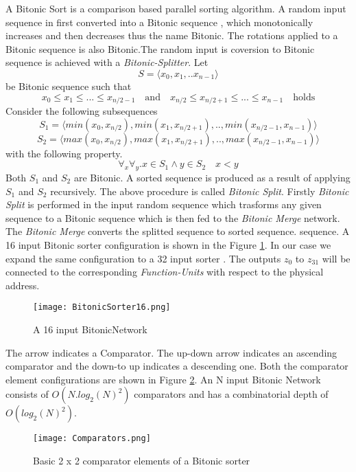 			    A Bitonic Sort\cite{bitonic_ref} is a comparison based parallel sorting algorithm. A random input sequence in first converted into a Bitonic sequence , which monotonically increases and then decreases thus the name Bitonic.
			    The rotations applied to a Bitonic sequence is also Bitonic.The random input is coversion to Bitonic sequence is achieved with a \textit{Bitonic-Splitter}.\newline
			    Let \[ 
				  S = \langle x_0,x_1,..x_{n-1}\rangle 
				\] be Bitonic sequence such that
				\[
				    x_0 \leq x_1 \leq ... \leq x_{n/2-1} \quad \textrm{and} \quad  x_{n/2} \leq x_{n/2+1} \leq ... \leq x_{n-1}  \quad \textrm{holds}
				\]
			    Consider the following subsequences
				\[
				  S_{1} =  \langle min(x_0,x_{n/2}), min(x_1,x_{n/2+1}),..,min(x_{n/2-1},x_{n-1})\rangle
				\]
				\[
				  S_{2} =  \langle max(x_0,x_{n/2}), max(x_1,x_{n/2+1}),..,max(x_{n/2-1},x_{n-1})\rangle
				\]
			    with the following property.
				\[
				  \forall _{x} \forall _{y}. x \in S_{1}  \wedge  y \in S_{2} \quad x < y
				\]
			    Both $S_{1}$ and $S_{2}$ are Bitonic. A sorted sequence is produced as a result of applying $S_{1}$ and $S_{2}$ recursively. The above procedure is called \textit{Bitonic Split}. Firstly \textit{Bitonic Split} is performed 
			    in the input random sequence which trasforms any given sequence to a Bitonic sequence which is then fed to the \textit{Bitonic Merge} network. The \textit{Bitonic Merge} converts the splitted sequence to sorted sequence.
			    sequence. A 16 input Bitonic sorter configuration is shown in the Figure \ref{fig:BitonicSorter16}. In our case we expand the same configuration to a 32 input sorter . The outputs $z_{0}$ to $z_{31}$  will
			    be connected to the corresponding \textit{Function-Units} with respect to the physical address.
				    \begin{figure}[!ht]
					      \texttt{[image: BitonicSorter16.png]}
					    \caption{A 16 input BitonicNetwork}
				    \label{fig:BitonicSorter16}
				    \end{figure}
			    The arrow indicates a Comparator. The up-down arrow indicates an ascending comparator and the down-to up indicates a descending one. Both the comparator element configurations are shown in Figure \ref{fig:Comparators}. 
			    An N input Bitonic Network consists of $O(N.log_{2}(N)^{2})$ comparators and has a combinatorial depth of $O(log_{2}(N)^{2})$.
				    \begin{figure}[!ht]
					      \texttt{[image: Comparators.png]}
					    \caption{Basic 2 x 2 comparator elements of a Bitonic sorter}
				    \label{fig:Comparators}
				    \end{figure}
